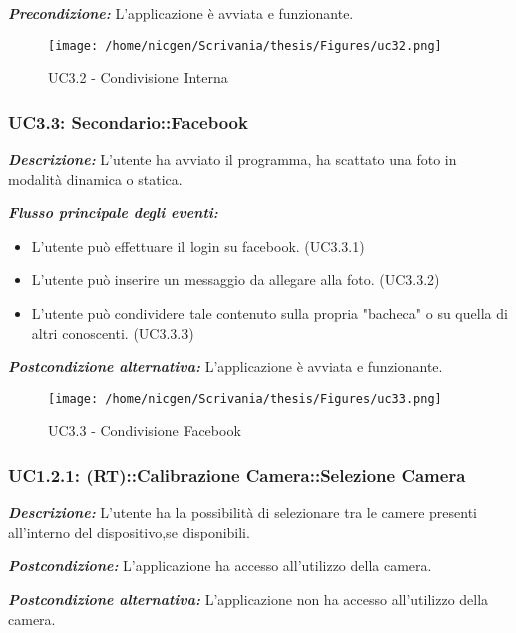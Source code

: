\textbf{\textit{Precondizione:}} L'applicazione è avviata e funzionante.


\begin{figure}[H]\centering  
\texttt{[image: /home/nicgen/Scrivania/thesis/Figures/uc32.png]}
\caption[UC3.2 - Condivisione Interna]{UC3.2 - Condivisione Interna}
\label{pic-a}
\end{figure}

\subsubsection{UC3.3: Secondario::Facebook}

\textbf{\textit{Descrizione:}} L'utente ha avviato il programma, ha scattato una foto in modalità dinamica o statica.

\textbf{\textit{Flusso principale degli eventi:}} 

\begin{itemize}
\item L'utente può effettuare il login su facebook. (UC3.3.1)
\item L'utente può inserire un messaggio da allegare alla foto. (UC3.3.2)
\item L'utente può condividere tale contenuto sulla propria "bacheca" o su quella di altri conoscenti. (UC3.3.3)
\end{itemize}

\textbf{\textit{Postcondizione alternativa:}} L'applicazione è avviata e funzionante.


\begin{figure}[H]\centering  
\texttt{[image: /home/nicgen/Scrivania/thesis/Figures/uc33.png]}
\caption[UC3.3 - Condivisione Facebook]{UC3.3 - Condivisione Facebook}
\label{pic-a}
\end{figure}

\subsubsection{UC1.2.1: (RT)::Calibrazione Camera::Selezione Camera}

\textbf{\textit{Descrizione:}} L'utente ha la possibilità di selezionare tra le camere presenti all'interno del dispositivo,se disponibili. 

\textbf{\textit{Postcondizione:}} L'applicazione ha accesso all'utilizzo della camera.

\textbf{\textit{Postcondizione alternativa:}} L'applicazione non ha accesso all'utilizzo della camera.

